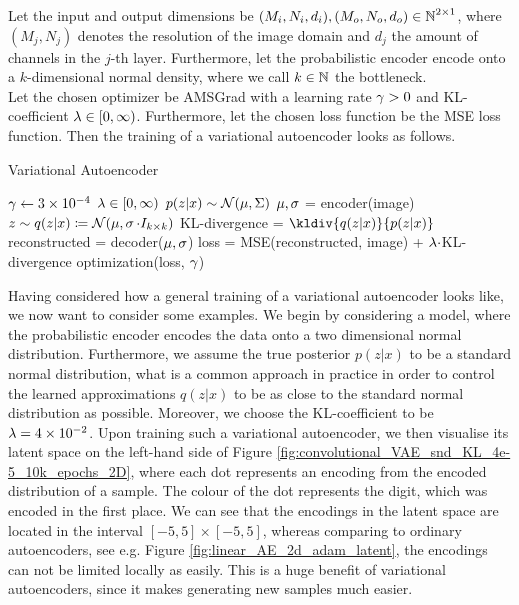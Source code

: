 \begin{algorithm}
Let the input and output dimensions be $(M_i,N_i, d_i), (M_o,N_o,d_o) \in \operatorname{\mathbb{N}}^{2\times 1}$, where $(M_j, N_j)$ denotes the resolution of the image domain and $d_j$ the amount of channels in the $j$-th layer. Furthermore, let the probabilistic encoder encode onto a $k$-dimensional normal density, where we call $k\in\operatorname{\mathbb{N}}$ the bottleneck.\\
Let the chosen optimizer be AMSGrad with a learning rate $\operatorname{\gamma}>0$ and KL-coefficient $\lambda\in[0,\infty)$. Furthermore, let the chosen loss function be the MSE loss function. Then the training of a variational autoencoder looks as follows.
\caption{Variational Autoencoder}\label{alg:general_vae}
\begin{algorithmic}[1]
\Require $\operatorname{\gamma} \gets \num{3e-4}$ 
\Require $\lambda \in [0,\infty)$ 
\Require $p(z|x) \sim \mathcal{N}(\operatorname{\mu},\Sigma)$ 
	    \State $\operatorname{\mu}, \operatorname{\sigma}$ = encoder(image) 
	    \State $z\sim q(z|x) \coloneqq\mathcal{N}(\operatorname{\mu}, \operatorname{\sigma}\cdot I_{k\times k})$ 
    	\State KL-divergence = $\kldiv{q(z|x)}{p(z|x)}$ 
		\State reconstructed = decoder($\operatorname{\mu}, \operatorname{\sigma}$) 
    	\State loss = MSE(reconstructed, image) + $\lambda\cdot$KL-divergence 
	    \State optimization(loss, $\operatorname{\gamma}$) 
    \EndFor
\EndFor
\end{algorithmic}
\end{algorithm}

Having considered how a general training of a variational autoencoder looks like, we now want to consider some examples. We begin by considering a model, where the probabilistic encoder encodes the data onto a two dimensional normal distribution. Furthermore, we assume the true posterior $p(z|x)$ to be a standard normal distribution, what is a common approach in practice in order to control the learned approximations $q(z|x)$ to be as close to the standard normal distribution as possible. Moreover, we choose the KL-coefficient to be $\lambda=\num{4e-2}$. Upon training such a variational autoencoder, we then visualise its latent space on the left-hand side of Figure \ref{fig:convolutional_VAE_snd_KL_4e-5_10k_epochs_2D}, where each dot represents an encoding from the encoded distribution of a sample. The colour of the dot represents the digit, which was encoded in the first place. We can see that the encodings in the latent space are located in the interval $[-5, 5]\times [-5, 5]$, whereas comparing to ordinary autoencoders, see e.g. Figure \ref{fig:linear_AE_2d_adam_latent}, the encodings can not be limited locally as easily. This is a huge benefit of variational autoencoders, since it makes generating new samples much easier.

